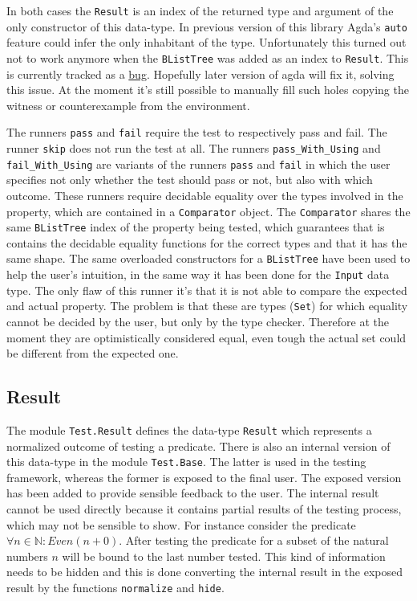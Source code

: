 \documentclass[10pt,a4paper]{article}
\begin{document}
In both cases the \texttt{Result} is an index of the returned type and argument of the only constructor of this data-type. In previous version of this library 
Agda's \texttt{auto} feature could infer the only inhabitant of the type.
Unfortunately this turned out not to work anymore when the \texttt{BListTree} was added as an index to \texttt{Result}. This is currently tracked as a \href{http://code.google.com/p/agda/issues/detail?id=1223}{bug}. Hopefully later version of agda will fix it, solving this issue. At the moment it's still possible to manually fill such holes copying the witness or counterexample from the environment.

The runners \texttt{pass} and \texttt{fail} require the test to respectively pass and fail. The runner \texttt{skip} does not run the test at all.
The runners \texttt{pass\_With\_Using} and \texttt{fail\_With\_Using} are variants of the runners \texttt{pass} and \texttt{fail} in which the user specifies not only whether the test should pass or not, but also with which outcome.
These runners require decidable equality over the types involved in the property, which are contained in a \texttt{Comparator} object.
The \texttt{Comparator} shares the same \texttt{BListTree} index  of the property  being tested, which guarantees that is contains the decidable equality functions for the correct types and that it has the same shape.
The same overloaded constructors for a \texttt{BListTree} have been used to help the user's intuition, in the same way it has been done for the \texttt{Input} data type.
The only flaw of this runner it's that it is not able to compare the expected and actual property. The problem is that these are types (\texttt{Set}) for which equality cannot be decided by the user, but only by the type checker.
Therefore at the moment they are optimistically considered equal, even tough the actual set could be different from the expected one.

\subsection{Result}
\label{sec:Result}
The module \texttt{Test.Result} defines the data-type \texttt{Result} which represents a normalized outcome of testing a predicate.
There is also an internal version of this data-type in the module \texttt{Test.Base}.
The latter is used in the testing framework, whereas the former is exposed to the final user. The exposed version has been added to provide sensible feedback to the user. The internal result cannot be used directly because it contains partial results of the testing process, which may not be sensible to show. For instance consider the predicate $\forall n \in \mathbb{N} : Even (n + 0)$. After testing the predicate for a subset of the natural numbers $n$ will be bound to the last number tested. This kind of information needs to be hidden and this is done converting the internal result in the exposed result by the functions \texttt{normalize} and \texttt{hide}.
\end{document}
